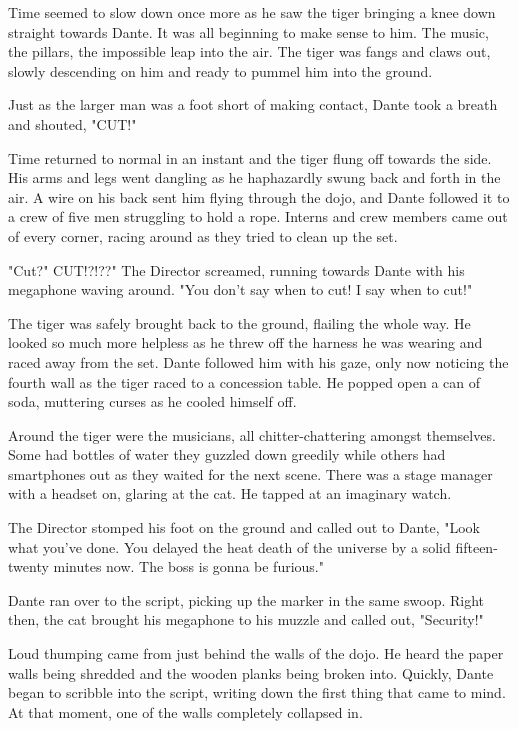 Time seemed to slow down once more as he saw the tiger bringing a knee down straight towards Dante. It was all beginning to make sense to him. The music, the pillars, the impossible leap into the air. The tiger was fangs and claws out, slowly descending on him and ready to pummel him into the ground.

Just as the larger man was a foot short of making contact, Dante took a breath and shouted, "CUT!"

Time returned to normal in an instant and the tiger flung off towards the side. His arms and legs went dangling as he haphazardly swung back and forth in the air. A wire on his back sent him flying through the dojo, and Dante followed it to a crew of five men struggling to hold a rope. Interns and crew members came out of every corner, racing around as they tried to clean up the set.

"Cut?" CUT!?!??" The Director screamed, running towards Dante with his megaphone waving around. "You don't say when to cut! I say when to cut!"

The tiger was safely brought back to the ground, flailing the whole way. He looked so much more helpless as he threw off the harness he was wearing and raced away from the set. Dante followed him with his gaze, only now noticing the fourth wall as the tiger raced to a concession table. He popped open a can of soda, muttering curses as he cooled himself off.

Around the tiger were the musicians, all chitter-chattering amongst themselves. Some had bottles of water they guzzled down greedily while others had smartphones out as they waited for the next scene. There was a stage manager with a headset on, glaring at the cat. He tapped at an imaginary watch.

The Director stomped his foot on the ground and called out to Dante, "Look what you've done. You delayed the heat death of the universe by a solid fifteen-twenty minutes now. The boss is gonna be furious."

Dante ran over to the script, picking up the marker in the same swoop. Right then, the cat brought his megaphone to his muzzle and called out, "Security!"

Loud thumping came from just behind the walls of the dojo. He heard the paper walls being shredded and the wooden planks being broken into. Quickly, Dante began to scribble into the script, writing down the first thing that came to mind. At that moment, one of the walls completely collapsed in.

